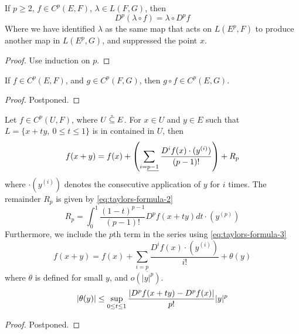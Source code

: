 \documentclass[../main-v2-manifolds.tex]{subfiles}
\begin{document}
\begin{wts}\label{prop:linear-maps-commute-with-p-derivative}
    If $p\geq 2$, $f\in C^p(E,F)$, $\lambda\in L(F,G)$, then
    \[
        D^p(\lambda\circ f) = \lambda\circ D^pf
    \]
    Where we have identified $\lambda$ as the same map that acts on $L(E^p, F)$ to produce another map in $L(E^p, G)$, and suppressed the point $x$.
\end{wts}
\begin{proof}
    Use induction on $p$.
\end{proof}
\begin{wts}\label{prop:Cp-banach-closed-under-composition}
    If $f\in C^p(E,F)$, and $g\in C^p(F,G)$, then $g\circ f\in C^p(E,G)$.
\end{wts}
\begin{proof}
    Postponed.
\end{proof}
\begin{wts}\label{prop:taylors-formula}
    Let $f\in C^p(U, F)$, where $U\:\mathring{\subseteq}\: E$. For $x\in U$ and $y\in E$ such that $L = \{x + ty,\: 0\leq t\leq 1\}$ is in contained in $U$, then 
    \begin{equation}\label{eq:taylors-formula-1}
        f(x+y) = f(x) + \qty(\sum_{i=\underline{p-1}}\dfrac{D^if(x)\cdot (y^{(i)})}{(p-1)!}) + R_p
    \end{equation}
    where $\cdot (y^{(i)})$ denotes the consecutive application of $y$ for $i$ times. The remainder $R_p$ is given by \cref{eq:taylors-formula-2}
    \begin{equation}\label{eq:taylors-formula-2}
        R_p = \int_0^1 \dfrac{(1-t)^{p-1}}{(p-1)!}D^p f(x+ty)dt\cdot (y^{(p)})
    \end{equation}
    Furthermore, we include the $p$th term in the series using \cref{eq:taylors-formula-3}
    \begin{equation}\label{eq:taylors-formula-3}
        f(x+y) = f(x) +\sum_{i=\underline{p}}\dfrac{D^if(x)\cdot (y^{(i)})}{i!} + \theta(y)
    \end{equation}
    where $\theta$ is defined for small $y$, and $o(\vert y\vert^p)$. 
    \begin{equation}\label{eq:taylors-formula-4}
        \vert {\theta(y)} \vert\leq\sup_{0\leq t\leq 1}\dfrac{\vert {D^p f(x+ty) - D^p f(x)} \vert}{p!}\vert {y} \vert^p
    \end{equation}
\end{wts}
\begin{proof}
    Postponed.
\end{proof}
\end{document}
